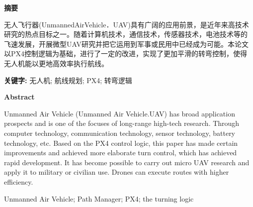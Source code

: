 \documentclass[UTF8,a4paper,10pt,nocolorlinks]{ctexart}
\begin{document}
    \renewcommand{\contentsname}{目录}  %
    \tableofcontents
    \thispagestyle{empty} %
    \clearpage %


     
    \renewcommand{\abstractname}{摘要}  %
    \begin{center}
        \large{\textbf{摘要}}
    \end{center}
    \begin{adjustwidth}{0cm}{0cm}
        \hspace{2em} 无人飞行器(UnmannedAirVehicle．UAV)具有广阔的应用前景，是近年来高技术研究的热点目标之一。随着计算机技术，通信技术，传感器技术，电池技术等的
        飞速发展，开展微型UAV研究并把它运用到军事或民用中已经成为可能。本论文以PX4控制逻辑为基础，进行了一定的改进，实现了更加平滑的转弯控制，使得
        无人机能以更地高效率执行航线。
        \begin{flushleft}
        \par\textbf{关键字: } 无人机; 航线规划; PX4; 转弯逻辑 %
        \end{flushleft}
    \end{adjustwidth}
    \thispagestyle{empty} %
    \clearpage

    \begin{center}
        \large{\textbf{Abstract}}
    \end{center}
    \begin{adjustwidth}{0cm}{0cm}
        \hspace{1em} Unmanned Air Vehicle (Unmanned Air Vehicle.UAV) has broad application prospects and is one of the focuses of long-range high-tech research. Through computer technology, communication technology, sensor technology, battery technology, etc.
        Based on the PX4 control logic, this paper has made certain improvements and achieved more elaborate turn control, which has achieved rapid development. It has become possible to carry out micro UAV research and apply it to military or civilian use.
        Drones can execute routes with higher efficiency.
    \end{adjustwidth}
    \begin{keywords}
        \noindent Unmanned Air Vehicle; Path Manager; PX4; the turning logic     
    \end{keywords}
    \thispagestyle{empty} %
    \clearpage %
\end{document}
